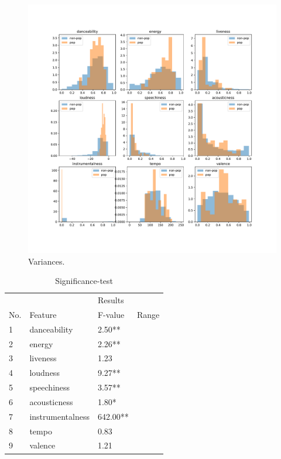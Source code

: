 \documentclass{article}
\begin{document}
\begin{figure}
  \centering
  \includegraphics[width=1\linewidth]{../fig/002_variances.pdf}
  \caption{Variances.}
\end{figure}

\begin{table}[h!]
  \caption{Significance-test}
  \label{sample-table}
  \centering
  \begin{tabular}{lllc}
    \toprule
      &                     &  Results    &\\
    \cmidrule(r){3-4}
    No.     & Feature     & F-value & Range\\
    \midrule
    1 & danceability        &  2.50** &\\
	2 & energy              &  2.26** &\\
	3 & liveness            &  1.23   &\\
	4 & loudness            &  9.27** &\\
	5 & speechiness         &  3.57** &\\
	6 & acousticness        &  1.80*  &\\
	7 & instrumentalness    &642.00** &\\
	8 & tempo               &  0.83   &\\
	9 & valence             &  1.21   &\\
    \bottomrule
  \end{tabular}
\end{table}
\end{document}

